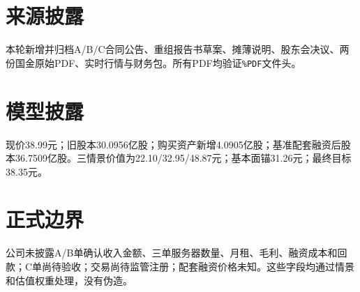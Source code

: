 \section{来源披露}

本轮新增并归档A/B/C合同公告、重组报告书草案、摊薄说明、股东会决议、两份国金原始PDF、实时行情与财务包。所有PDF均验证\texttt{\%PDF}文件头。

\section{模型披露}

现价38.99元；旧股本30.0956亿股；购买资产新增4.0905亿股；基准配套融资后股本36.7509亿股。三情景价值为22.10/32.95/48.87元；基本面锚31.26元；最终目标38.35元。

\section{正式边界}

公司未披露A/B单确认收入金额、三单服务器数量、月租、毛利、融资成本和回款；C单尚待验收；交易尚待监管注册；配套融资价格未知。这些字段均通过情景和估值权重处理，没有伪造。
